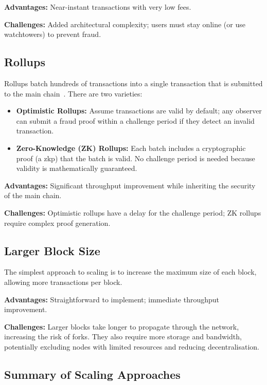 \textbf{Advantages:} Near-instant transactions with very low fees.

\textbf{Challenges:} Added architectural complexity; users must stay online (or use watchtowers) to prevent fraud.

\subsection{Rollups}
\label{sec:rollups}

Rollups batch hundreds of transactions into a single transaction that is submitted to the main chain~\cite{buterin2021rollups}. There are two varieties:
\begin{itemize}
    \item \textbf{Optimistic Rollups:} Assume transactions are valid by default; any observer can submit a fraud proof within a challenge period if they detect an invalid transaction.
    \item \textbf{Zero-Knowledge (ZK) Rollups:} Each batch includes a cryptographic proof (a \gls{zkp}) that the batch is valid. No challenge period is needed because validity is mathematically guaranteed.
\end{itemize}

\textbf{Advantages:} Significant throughput improvement while inheriting the security of the main chain.

\textbf{Challenges:} Optimistic rollups have a delay for the challenge period; ZK rollups require complex proof generation.

\subsection{Larger Block Size}

The simplest approach to scaling is to increase the maximum size of each block, allowing more transactions per block.

\textbf{Advantages:} Straightforward to implement; immediate throughput improvement.

\textbf{Challenges:} Larger blocks take longer to propagate through the network, increasing the risk of forks. They also require more storage and bandwidth, potentially excluding nodes with limited resources and reducing decentralisation.

\subsection{Summary of Scaling Approaches}

